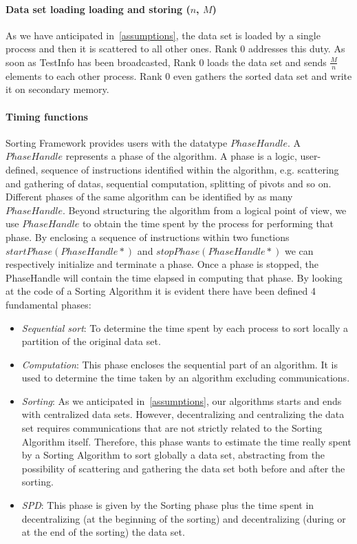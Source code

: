 \paragraph{Data set loading loading and storing ($n$, $M$)} As we have anticipated in~\ref{assumptions}, the data set is loaded by a single process and then it is scattered to all other ones. Rank $0$ addresses this duty. As soon as TestInfo has been broadcasted, Rank $0$ loads the data set and sends $\frac{M}{n}$ elements to each other process. Rank $0$ even gathers the sorted data set and write it on secondary memory.

\paragraph{Timing functions} Sorting Framework provides users with the datatype $PhaseHandle$. A $PhaseHandle$ represents a phase of the algorithm. A phase is a logic, user-defined, sequence of instructions identified within the algorithm,  e.g. scattering and gathering of datas, sequential computation, splitting of pivots and so on. Different phases of the same algorithm can be identified by as many $PhaseHandle$. Beyond structuring the algorithm from a logical point of view, we use $PhaseHandle$ to obtain the time spent by the process for performing that phase. By enclosing a sequence of instructions within two functions $startPhase(PhaseHandle*)$ and $stopPhase(PhaseHandle*)$ we can respectively initialize and terminate a phase. Once a phase is stopped, the PhaseHandle will contain the time elapsed in computing that phase. By looking at the code of a Sorting Algorithm it is evident there have been defined 4 fundamental phases: 
\begin{itemize}
\item \textit{Sequential sort}: To determine the time spent by each process to sort locally a partition of the original data set. 
\item \textit{Computation}: This phase encloses the sequential part of an algorithm. It is used to determine the time taken by an algorithm excluding communications.
\item \textit{Sorting}: As we anticipated in~\ref {assumptions}, our algorithms starts and ends with centralized data sets. However, decentralizing and centralizing the data set requires communications that are not strictly related to the Sorting Algorithm itself. Therefore, this phase wants to estimate the time really spent by a Sorting Algorithm to sort globally a data set, abstracting from the possibility of scattering and gathering the data set both before and after the sorting.
\item \textit{SPD}: This phase is given by the Sorting phase plus the time spent in decentralizing (at the beginning of the sorting) and decentralizing (during or at the end of the sorting) the data set.
\end{itemize}
